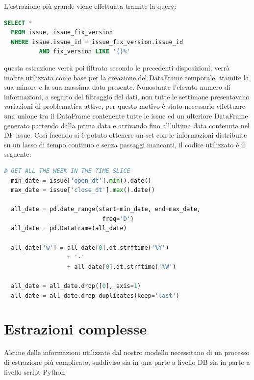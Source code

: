 \documentclass[%
    corpo=12pt,
    twoside,
    oldstyle,
    autoretitolo,
    greek,
    evenboxes,
]{toptesi}
\begin{document}
L'estrazione più grande viene effettuata tramite la query:
\begin{lstlisting}[language=SQL, frame=single, basicstyle=\small]
  SELECT * 
  FROM issue, issue_fix_version
  WHERE issue.issue_id = issue_fix_version.issue_id 
          AND fix_version LIKE '{}%' 
\end{lstlisting}
questa estrazione verrà poi filtrata secondo le precedenti disposizioni, verrà inoltre utilizzata come base per la creazione del DataFrame temporale, tramite la sua minore e la sua massima data presente. Nonostante l'elevato numero di informazioni, a seguito del filtraggio del dati, non tutte le settimane presentavano variazioni di problematica attive, per questo motivo è stato necessario effettuare una unione tra il DataFrame contenente tutte le issue ed un ulteriore DataFrame generato partendo dalla prima data e arrivando fino all'ultima data contenuta nel DF issue. Così facendo si è potuto ottenere un set con le informazioni distribuite su un lasso di tempo continuo e senza passaggi mancanti, il codice utilizzato è il seguente:
\begin{lstlisting}[language=Python, frame=single, basicstyle=\small]
  # GET ALL THE WEEK IN THE TIME SLICE
  min_date = issue['open_dt'].min().date()
  max_date = issue['close_dt'].max().date()
  
  all_date = pd.date_range(start=min_date, end=max_date,
                            freq='D')
  all_date = pd.DataFrame(all_date)

  all_date['w'] = all_date[0].dt.strftime('%Y') 
                  + '-' 
                  + all_date[0].dt.strftime('%W')

  all_date = all_date.drop([0], axis=1)
  all_date = all_date.drop_duplicates(keep='last')
\end{lstlisting}

\section{Estrazioni complesse}
Alcune delle informazioni utilizzate dal nostro modello necessitano di un processo di estrazione più complicato, suddiviso sia in una parte a livello DB sia in parte a livello script Python.
\end{document}
